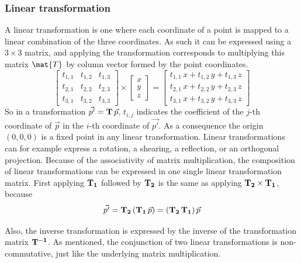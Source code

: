 \subsubsection{Linear transformation}
A linear transformation is one where each coordinate of a point is mapped to a linear combination of the three coordinates. As such it can be expressed using a $3 \times 3$ matrix, and applying the transformation corresponds to multiplying this matrix $\mat{T}$ by column vector formed by the point coordinates.
\begin{equation}
\left[ \begin{matrix}
	t_{1,1} & t_{1,2} & t_{1,3} \\
	t_{2,1} & t_{2,2} & t_{2,3} \\
	t_{3,1} & t_{3,2} & t_{3,3}
\end{matrix} \right] \times
\left[ \begin{matrix} x \\ y \\ z \end{matrix} \right] = 
\left[ \begin{matrix}
	t_{1,1} \, x + t_{1,2} \, y + t_{1,3} \, z \\
	t_{2,1} \, x + t_{2,2} \, y + t_{2,3} \, z \\
	t_{3,1} \, x + t_{3,2} \, y + t_{3,3} \, z
\end{matrix} \right]
\end{equation}
So in a transformation $\vec{p'} = \mathbf{T} \, \vec{p}$, $t_{i,j}$ indicates the coefficient of the $j$-th coordinate of $\vec{p}$ in the $i$-th coordinate of $\vec{p'}$. As a consequence the origin $(0, 0, 0)$ is a fixed point in any linear transformation. Linear transformations can for example express a rotation, a shearing, a reflection, or an orthogonal projection. Because of the associativity of matrix multiplication, the composition of linear transformations can be expressed in one single linear transformation matrix. First applying $\mathbf{T_1}$ followed by $\mathbf{T_2}$ is the same as applying $\mathbf{T_2} \times \mathbf{T_1}$, because
\begin{equation}
	\vec{p'} = \mathbf{T_2} \, ( \mathbf{T_1} \, \vec{p} ) = (\mathbf{T_2} \, \mathbf{T_1}) \, \vec{p}
\end{equation}

Also, the inverse transformation is expressed by the inverse of the transformation matrix $\mathbf{T^{-1}}$. As mentioned, the conjunction of two linear transformations is non-commutative, just like the underlying matrix multiplication.

